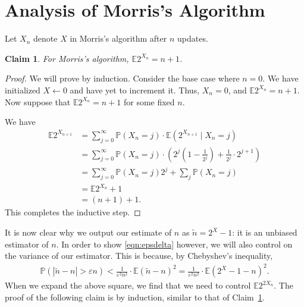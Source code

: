\documentclass[11pt]{article}
\newtheorem{claim}[theorem]{Claim}
\begin{document}
\section{Analysis of Morris's Algorithm}\label{analysis}

Let $X_n$ denote $X$ in Morris's algorithm after $n$ updates.

\begin{claim}\label{claim:expectation}
For Morris's algorithm, $\mathbb{E}2^{X_n} = n + 1$.
\end{claim}

\begin{proof}
We will prove by induction. Consider the base case where $n = 0$. We have initialized $X \leftarrow 0$ and have yet to increment it. Thus, $X_n = 0$, and $\mathbb{E}2^{X_n} = n + 1$. Now suppose that $\mathbb{E}2^{X_n} = n + 1$ for some fixed $n$.

We have
\allowdisplaybreaks
\begin{equation}
\begin{split}
    \mathbb{E}2^{X_{n + 1}} &= \sum_{j = 0}^{\infty}{\mathbb{P}(X_n = j) \cdot \mathbb{E}(2^{X_{n + 1}} \mid X_n = j)} \\
        &= \sum_{j = 0}^{\infty}{\mathbb{P}(X_n = j) \cdot \left(2^j\left(1 - \frac{1}{2^j}\right) + \frac{1}{2^j} \cdot 2^{j + 1}\right)} \\
        &= \sum_{j = 0}^{\infty}{\mathbb{P}(X_n = j)2^j} + \sum_{j}{\mathbb{P}(X_n = j)} \\
        &= \mathbb{E}2^{X_n} + 1 \\
        &= (n + 1) + 1.
\end{split}
\end{equation}
This completes the inductive step.
\end{proof}

It is now clear why we output our estimate of $n$ as $\tilde{n} = 2^X - 1$: it is an unbiased estimator of $n$. In order to show \eqref{eqn:epsdelta} however, we will also control on the variance of our estimator. This is because, by Chebyshev's inequality,
\begin{align}
\mathbb{P}(|\tilde{n}-n|>\varepsilon n) < \frac{1}{\varepsilon^2n^2}\cdot \mathbb{E}(\tilde{n}-n)^2=\frac{1}{\varepsilon^2n^2} \cdot \mathbb{E}(2^X-1-n)^2.
\end{align}
When we expand the above square, we find that we need to control $\mathbb{E}2^{2X_n}$. The proof of the following claim is by induction, similar to that of Claim~\ref{claim:expectation}.
\end{document}
